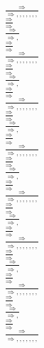 \documentclass[11pt]{article}
\begin{document}
\begin{center}
\bigskip
\\$\frac{\Rightarrow }{\Rightarrow , , , , , , , }$
\bigskip
\\$\frac{\Rightarrow }{\Rightarrow }$
\bigskip
\\$\frac{\Rightarrow }{\Rightarrow , }$
\bigskip
\\$\frac{\Rightarrow }{\Rightarrow }$
\bigskip
\\$\frac{\Rightarrow }{\Rightarrow , , , , , , , }$
\bigskip
\\$\frac{\Rightarrow }{\Rightarrow }$
\bigskip
\\$\frac{\Rightarrow }{\Rightarrow , }$
\bigskip
\\$\frac{\Rightarrow }{\Rightarrow }$
\bigskip
\\$\frac{\Rightarrow }{\Rightarrow , , , , , , , }$
\bigskip
\\$\frac{\Rightarrow }{\Rightarrow }$
\bigskip
\\$\frac{\Rightarrow }{\Rightarrow , }$
\bigskip
\\$\frac{\Rightarrow }{\Rightarrow }$
\bigskip
\\$\frac{\Rightarrow }{\Rightarrow , , , , , , , }$
\bigskip
\\$\frac{\Rightarrow }{\Rightarrow }$
\bigskip
\\$\frac{\Rightarrow }{\Rightarrow , }$
\bigskip
\\$\frac{\Rightarrow }{\Rightarrow }$
\bigskip
\\$\frac{\Rightarrow }{\Rightarrow , , , , , , , }$
\bigskip
\\$\frac{\Rightarrow }{\Rightarrow }$
\bigskip
\\$\frac{\Rightarrow }{\Rightarrow , }$
\bigskip
\\$\frac{\Rightarrow }{\Rightarrow }$
\bigskip
\\$\frac{\Rightarrow }{\Rightarrow , , , , , , , }$
\bigskip
\\$\frac{\Rightarrow }{\Rightarrow }$
\bigskip
\\$\frac{\Rightarrow }{\Rightarrow , }$
\bigskip
\\$\frac{\Rightarrow }{\Rightarrow }$
\bigskip
\\$\frac{\Rightarrow }{\Rightarrow , , , , , , , }$
\bigskip
\\$\frac{\Rightarrow }{\Rightarrow }$
\bigskip
\\$\frac{\Rightarrow }{\Rightarrow , }$
\bigskip
\\$\frac{\Rightarrow }{\Rightarrow }$
\bigskip
\\$\frac{\Rightarrow }{\Rightarrow , , , , , , , }$

\end{center}
\end{document}
